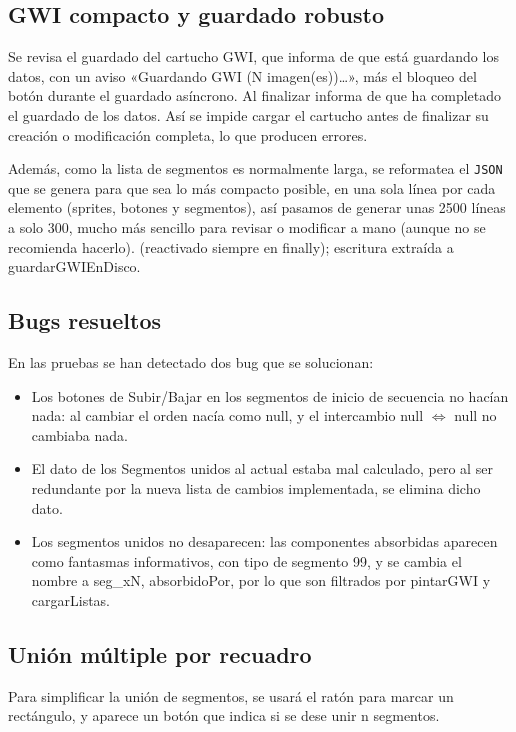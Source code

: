 \subsection{GWI compacto y guardado robusto}
Se revisa el guardado del cartucho GWI, que informa de que está guardando los datos, con un aviso «Guardando GWI (N imagen(es))…», más el bloqueo del botón durante el guardado asíncrono. Al finalizar informa de que ha completado el guardado de los datos. Así se impide cargar el cartucho antes de finalizar su creación o modificación completa, lo que producen errores.

Además, como la lista de segmentos es normalmente larga, se reformatea el \texttt{JSON} que se genera para que sea lo más compacto posible, en una sola línea por cada elemento (sprites, botones y segmentos), así pasamos de generar unas 2500 líneas a solo 300, mucho más sencillo para revisar o modificar a mano (aunque no se recomienda hacerlo).
 (reactivado siempre en finally); escritura extraída a guardarGWIEnDisco.

\subsection{Bugs resueltos}
En las pruebas se han detectado dos bug que se solucionan:

\begin{itemize}
	\item Los botones de Subir/Bajar en los segmentos de inicio de secuencia no hacían nada: al cambiar el orden nacía como null, y el intercambio null \ensuremath{\Leftrightarrow} null no cambiaba nada. 
	
	\item El dato de los Segmentos unidos al actual estaba mal calculado, pero al ser redundante por la nueva lista de cambios implementada, se elimina dicho dato.
	
	\item Los segmentos unidos no desaparecen: las componentes absorbidas aparecen como fantasmas informativos, con tipo de segmento 99, y se cambia el nombre a seg\_xN, absorbidoPor, por lo que son filtrados por pintarGWI y cargarListas.
\end{itemize}

\subsection{Unión múltiple por recuadro}
Para simplificar la unión de segmentos, se usará el ratón para marcar un rectángulo, y aparece un botón que indica si se dese unir n segmentos.

